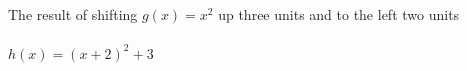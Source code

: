 {The result of shifting $g(x)=x^2$ up three units and to the left two units}
{\text{}\\ \label{fig:01_05_ex_11}\\
$h(x)=(x+2)^2+3$}
